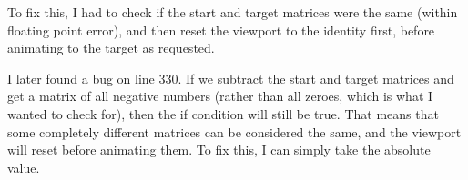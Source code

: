 \documentclass[../development.tex]{subfiles}
\begin{document}
To fix this, I had to check if the start and target matrices were the same (within floating point error), and then reset the viewport to the identity first, before animating to the target as requested.


I later found a bug on line 330. If we subtract the start and target matrices and get a matrix of all negative numbers (rather than all zeroes, which is what I wanted to check for), then the if condition will still be true. That means that some completely different matrices can be considered the same, and the viewport will reset before animating them. To fix this, I can simply take the absolute value.

\end{document}
